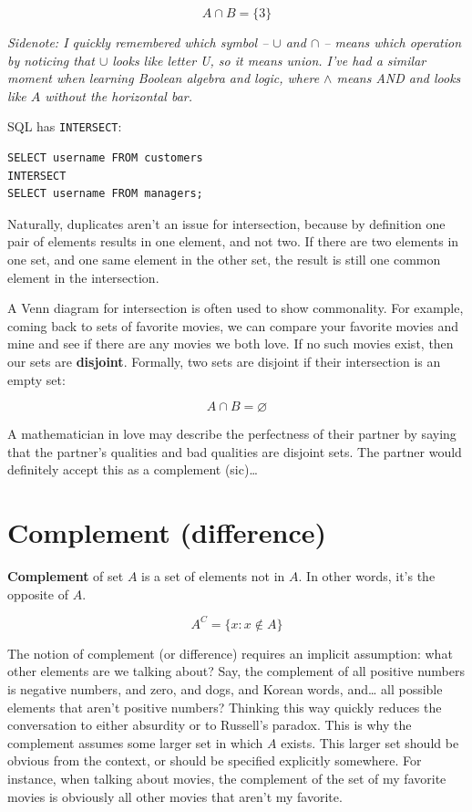 \documentclass[a4paper, justified, notitlepage, sfsidenotes, notoc]{tufte-book}
\begin{document}
\begin{equation}
A \cap B = \{3\}
\end{equation}

\emph{Sidenote: I quickly remembered which symbol -- \(\cup\) and \(\cap\) -- means which operation by noticing that \(\cup\) looks like letter U, so it means union. I've had a similar moment when learning Boolean algebra and logic, where \(\wedge\) means AND and looks like \(A\) without the horizontal bar.}

SQL has \texttt{INTERSECT}:

\begin{verbatim}
SELECT username FROM customers
INTERSECT
SELECT username FROM managers;
\end{verbatim}

Naturally, duplicates aren't an issue for intersection, because by definition one pair of elements results in one element, and not two. If there are two elements in one set, and one same element in the other set, the result is still one common element in the intersection.

A Venn diagram for intersection is often used to show commonality. For example, coming back to sets of favorite movies, we can compare your favorite movies and mine and see if there are any movies we both love. If no such movies exist, then our sets are \textbf{\textbf{disjoint}}. Formally, two sets are disjoint if their intersection is an empty set:

\begin{equation}
A \cap B = \varnothing
\end{equation}

A mathematician in love may describe the perfectness of their partner by saying that the partner's qualities and bad qualities are disjoint sets. The partner would definitely accept this as a complement (sic)\ldots{}

\section{Complement (difference)}
\label{sec:org6d0ccb7}

\textbf{\textbf{Complement}} of set \(A\) is a set of elements not in \(A\). In other words, it's the opposite of \(A\).

\begin{equation}
A^{C} = \{x : x \notin A \}
\end{equation}

The notion of complement (or difference) requires an implicit assumption: what other elements are we talking about? Say, the complement of all positive numbers is negative numbers, and zero, and dogs, and Korean words, and\ldots{} all possible elements that aren't positive numbers? Thinking this way quickly reduces the conversation to either absurdity or to Russell's paradox. This is why the complement assumes some larger set in which \(A\) exists. This larger set should be obvious from the context, or should be specified explicitly somewhere. For instance, when talking about movies, the complement of the set of my favorite movies is obviously all other movies that aren't my favorite.
\end{document}

